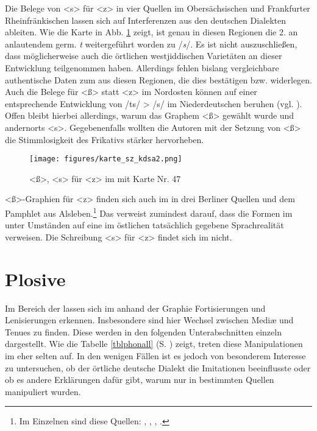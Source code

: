 Die Belege von <s> für <z> in vier Quellen im Obersächsischen und Frankfurter Rheinfränkischen lassen sich auf Interferenzen aus den deutschen Dialekten ableiten. Wie die Karte in Abb. \ref{karteszkdsa} zeigt, ist genau in diesen Regionen die 2.  an anlautendem germ. \textit{t} weitergeführt worden zu /\textit{s}/. Es ist nicht auszuschließen, dass möglicherweise auch die örtlichen westjiddischen Varietäten an dieser Entwicklung teilgenommen haben. Allerdings fehlen bislang vergleichbare authentische Daten zum  aus diesen Regionen, die dies bestätigen bzw. widerlegen. Auch die Belege für <ß> statt <z> im Nordosten können auf einer entsprechende Entwicklung von /ts/ > /s/ im Niederdeutschen beruhen (vgl. \cite[282]{Schirmunski1962}). Offen bleibt hierbei allerdings, warum das Graphem <ß> gewählt wurde und andernorts <s>. Gegebenenfalls wollten die Autoren mit der Setzung von <ß> die Stimmlosigkeit des Frikativs stärker hervorheben.\\


 \begin{figure}[h!]
		\centering
\texttt{[image: figures/karte\_sz\_kdsa2.png]}
		\caption{\label{karteszkdsa} <ß>, <s> für <z> im  mit  Karte Nr. 47}
		\end{figure}
\FloatBarrier

<ß>-Graphien für <z> finden sich auch im  in drei Berliner Quellen und dem Pamphlet aus Alsleben.\footnote{Im Einzelnen sind diese Quellen: , , , .} Das verweist zumindest darauf, dass die Formen im  unter Umständen auf eine im östlichen  tatsächlich gegebene Sprachrealität verweisen. Die Schreibung <s> für <z> findet sich im  nicht. \\


  \section{Plosive}\label{plosivekap}
  Im Bereich der  lassen sich im  anhand der Graphie Fortisierungen und Lenisierungen erkennen. Insbesondere sind hier Wechsel zwischen Mediæ und Tenues zu finden. Diese werden in den folgenden Unterabschnitten einzeln dargestellt. Wie die Tabelle \ref{tblphonall} (S. \pageref{tblphonall}) zeigt, treten diese Manipulationen im  eher selten auf. In den wenigen Fällen ist es jedoch von besonderem Interesse zu untersuchen, ob der örtliche deutsche Dialekt die Imitationen beeinflusste oder ob es andere Erklärungen dafür gibt, warum  nur in bestimmten Quellen manipuliert wurden.
  
